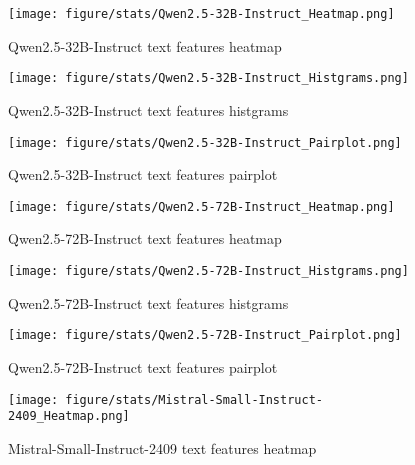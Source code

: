 \begin{figure}[H]
    \centering
    \texttt{[image: figure/stats/Qwen2.5-32B-Instruct\_Heatmap.png]}
    \caption{Qwen2.5-32B-Instruct text features heatmap}
    \label{fig:human_heatmap}
\end{figure}


\begin{figure}[H]
    \centering
    \texttt{[image: figure/stats/Qwen2.5-32B-Instruct\_Histgrams.png]}
    \caption{Qwen2.5-32B-Instruct text features histgrams}
    \label{fig:human_hist}
\end{figure}


\begin{figure}[H]
    \centering
    \texttt{[image: figure/stats/Qwen2.5-32B-Instruct\_Pairplot.png]}
    \caption{Qwen2.5-32B-Instruct text features pairplot}
    \label{fig:human_pairplot}
\end{figure}




\begin{figure}[H]
    \centering
    \texttt{[image: figure/stats/Qwen2.5-72B-Instruct\_Heatmap.png]}
    \caption{Qwen2.5-72B-Instruct text features heatmap}
    \label{fig:human_heatmap}
\end{figure}


\begin{figure}[H]
    \centering
    \texttt{[image: figure/stats/Qwen2.5-72B-Instruct\_Histgrams.png]}
    \caption{Qwen2.5-72B-Instruct text features histgrams}
    \label{fig:human_hist}
\end{figure}


\begin{figure}[H]
    \centering
    \texttt{[image: figure/stats/Qwen2.5-72B-Instruct\_Pairplot.png]}
    \caption{Qwen2.5-72B-Instruct text features pairplot}
    \label{fig:human_pairplot}
\end{figure}



\begin{figure}[H]
    \centering
    \texttt{[image: figure/stats/Mistral-Small-Instruct-2409\_Heatmap.png]}
    \caption{Mistral-Small-Instruct-2409 text features heatmap}
    \label{fig:human_heatmap}
\end{figure}


